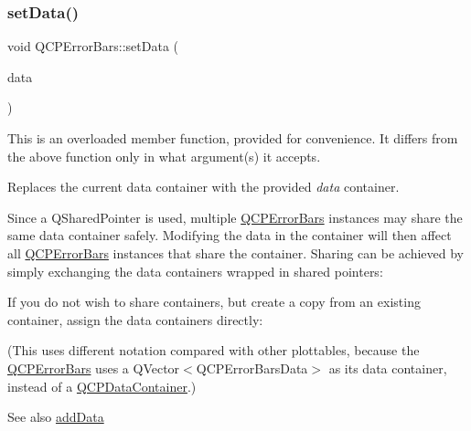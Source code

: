 \mbox{\label{class_q_c_p_error_bars_a92b1980003255f5f7c05407a4d92aabc}} 
\subsubsection{\texorpdfstring{setData()}{setData()}\hspace{0.1cm}{\footnotesize\ttfamily [1/3]}}
{\footnotesize\ttfamily void Q\+C\+P\+Error\+Bars\+::set\+Data (\begin{DoxyParamCaption}\item[{Q\+Shared\+Pointer$<$ \mbox{\hyperlink{qcustomplot_8h_a8c4472a4da738e0ddbf6b03222c39906}{Q\+C\+P\+Error\+Bars\+Data\+Container}} $>$}]{data }\end{DoxyParamCaption})}

This is an overloaded member function, provided for convenience. It differs from the above function only in what argument(s) it accepts.

Replaces the current data container with the provided {\itshape data} container.

Since a Q\+Shared\+Pointer is used, multiple \mbox{\hyperlink{class_q_c_p_error_bars}{Q\+C\+P\+Error\+Bars}} instances may share the same data container safely. Modifying the data in the container will then affect all \mbox{\hyperlink{class_q_c_p_error_bars}{Q\+C\+P\+Error\+Bars}} instances that share the container. Sharing can be achieved by simply exchanging the data containers wrapped in shared pointers\+: 
\begin{DoxyCodeInclude}{0}
\end{DoxyCodeInclude}
 If you do not wish to share containers, but create a copy from an existing container, assign the data containers directly\+: 
\begin{DoxyCodeInclude}{0}
\end{DoxyCodeInclude}
(This uses different notation compared with other plottables, because the \mbox{\hyperlink{class_q_c_p_error_bars}{Q\+C\+P\+Error\+Bars}} uses a {\ttfamily Q\+Vector$<$\+Q\+C\+P\+Error\+Bars\+Data$>$} as its data container, instead of a \mbox{\hyperlink{class_q_c_p_data_container}{Q\+C\+P\+Data\+Container}}.)

\begin{DoxySeeAlso}{See also}
\mbox{\hyperlink{class_q_c_p_error_bars_aae296ad9817b3fa418db284af81cecf8}{add\+Data}} 
\end{DoxySeeAlso}
\mbox{\label{class_q_c_p_error_bars_a2f33d68a7ec163b09017dce3d9d3abcc}} 
